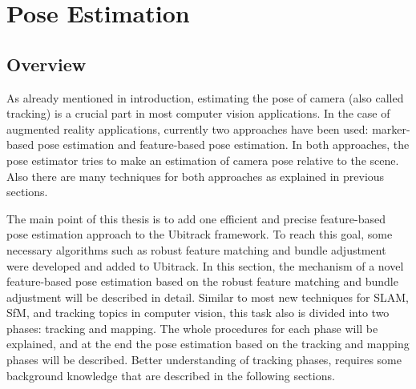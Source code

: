 \chapter{Pose Estimation}\label{chapter:pose_estimation}
\section{Overview}\label{sec:pose_estimation_overview}
As already mentioned in introduction, estimating the pose of camera (also called tracking) is a crucial part in most computer vision applications. In the case of augmented reality applications, currently two approaches have been used: marker-based pose estimation and feature-based pose estimation. In both approaches, the pose estimator tries to make an estimation of camera pose relative to the scene. Also there are many techniques for both approaches as explained in previous sections.

The main point of this thesis is to add one efficient and precise feature-based pose estimation approach to the Ubitrack framework. To reach this goal, some necessary algorithms such as robust feature matching and bundle adjustment were developed and added to Ubitrack. In this section, the mechanism of a novel feature-based pose estimation based on the robust feature matching and bundle adjustment will be described in detail. Similar to most new techniques for SLAM, SfM, and tracking topics in computer vision, this task also is divided into two phases: tracking and mapping. The whole procedures for each phase will be explained, and at the end the pose estimation based on the tracking and mapping phases will be described. Better understanding of tracking phases, requires some background knowledge that are described in the following sections.

